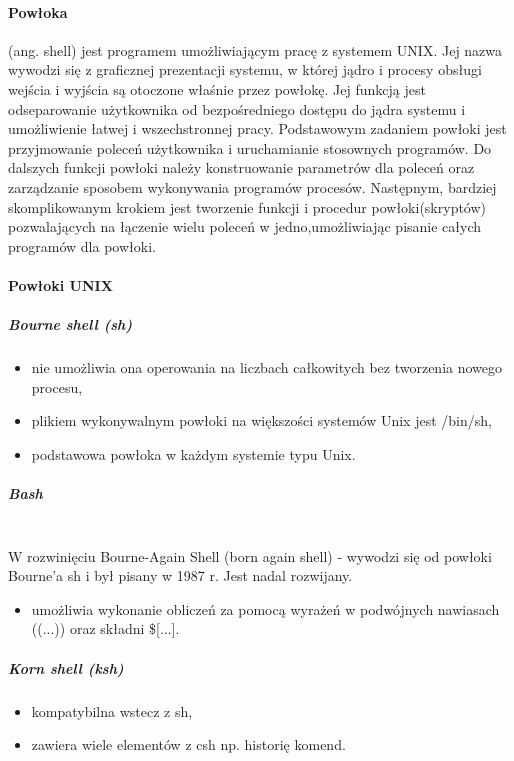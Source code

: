 \documentclass[a4paper,twoside]{report}
\begin{document}
\paragraph{Powłoka} (ang. shell) jest programem umożliwiającym pracę z systemem   UNIX. Jej nazwa wywodzi się z graficznej prezentacji systemu, w której jądro i procesy obsługi wejścia i wyjścia są otoczone właśnie przez powłokę. Jej funkcją jest odseparowanie użytkownika od bezpośredniego dostępu do jądra systemu i umożliwienie   łatwej i wszechstronnej pracy. Podstawowym zadaniem powłoki jest przyjmowanie     poleceń użytkownika i uruchamianie stosownych programów. Do dalszych funkcji powłoki należy konstruowanie parametrów dla poleceń oraz zarządzanie sposobem wykonywania programów procesów. Następnym, bardziej skomplikowanym krokiem jest tworzenie   funkcji i procedur powłoki(skryptów) pozwalających   na łączenie wielu   poleceń  w   jedno,umożliwiając pisanie całych programów dla powłoki.
\paragraph{Powłoki UNIX}

\subparagraph{Bourne shell (sh)}

\begin{itemize}
	\item nie umożliwia ona operowania na liczbach całkowitych bez tworzenia nowego procesu,
	\item plikiem wykonywalnym powłoki na większości systemów Unix jest /bin/sh,
	\item  podstawowa powłoka w każdym systemie typu Unix.
\end{itemize}

\subparagraph{Bash\\\\}
W rozwinięciu Bourne-Again Shell (born again shell) - wywodzi się od powłoki Bourne'a sh i był pisany w 1987 r. Jest nadal rozwijany.
\begin{itemize}
	\item umożliwia wykonanie obliczeń za pomocą wyrażeń w podwójnych nawiasach ((...)) oraz składni \$[...].
\end{itemize}

\subparagraph{Korn shell (ksh)}
\begin{itemize}
	\item kompatybilna wstecz z sh,
	\item zawiera wiele elementów z csh np. historię komend.
\end{itemize}
\end{document}
